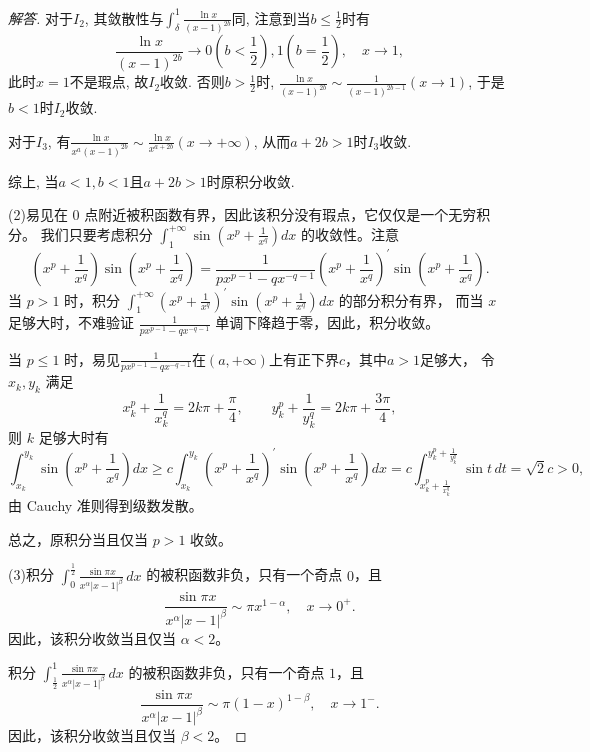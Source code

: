 \begin{a}
\begin{enumerate}
\begin{proof}[解答]
对于\(I_2\), 其敛散性与\(\int_{\delta}^{1}\frac{\ln x}{(x-1)^{2b}}\)同, 
注意到当\(b\leqslant\frac{1}{2}\)时有
\[\frac{\ln x}{(x-1)^{2b}}\rightarrow 0\left(b<\frac{1}{2}\right),1\left(b=\frac{1}{2}\right),\quad x\rightarrow 1,\]
此时\(x=1\)不是瑕点, 故\(I_2\)收敛. 否则\(b>\frac{1}{2}\)时, \(\frac{\ln x}{(x-1)^{2b}}\sim\frac{1}{(x-1)^{2b-1}}(x\rightarrow 1)\), 于是\(b<1\)时\(I_2\)收敛.

对于\(I_3\), 有\(\frac{\ln x}{x^a(x-1)^{2b}}\sim\frac{\ln x}{x^{a+2b}}(x\rightarrow+\infty)\), 从而\(a+2b>1\)时\(I_3\)收敛.

综上, 当\(a<1,b<1\)且\(a+2b>1\)时原积分收敛.

(2)易见在 $0$ 点附近被积函数有界，因此该积分没有瑕点，它仅仅是一个无穷积分。
我们只要考虑积分 \(\int_{1}^{+\infty} \sin \left(x^{p}+\frac{1}{x^{q}}\right) d x\) 的收敛性。注意
\[\left(x^{p}+\frac{1}{x^{q}}\right) \sin \left(x^{p}+\frac{1}{x^{q}}\right)
=\frac{1}{p x^{p-1}-q x^{-q-1}}\left(x^{p}+\frac{1}{x^{q}}\right)^{\prime} \sin \left(x^{p}+\frac{1}{x^{q}}\right).\]
当 $p>1$ 时，积分 \(\int_{1}^{+\infty}\left(x^{p}+\frac{1}{x^{q}}\right)^{\prime} \sin \left(x^{p}+\frac{1}{x^{q}}\right) d x\) 的部分积分有界，
而当 $x$ 足够大时，不难验证 \(\frac{1}{p x^{p-1}-q x^{-q-1}}\) 单调下降趋于零，因此，积分收敛。

当 $p \leqslant 1$ 时，易见\(\frac{1}{p x^{p-1}-q x^{-q-1}}\)在$(a,+\infty)$上有正下界$c$，其中$a>1$足够大，
令 $x_{k}, y_{k}$ 满足 \[x_{k}^{p}+\frac{1}{x_{k}^{q}}=2k\pi+\frac{\pi}{4}, \qquad y_{k}^{p}+\frac{1}{y_{k}^{q}}=2k\pi+\frac{3 \pi}{4},\]
则 $k$ 足够大时有
\[\int_{x_{k}}^{y_{k}} \sin \left(x^{p}+\frac{1}{x^{q}}\right) d x 
\geqslant c \int_{x_{k}}^{y_{k}}\left(x^{p}+\frac{1}{x^{q}}\right)^{\prime} \sin \left(x^{p}+\frac{1}{x^{q}}\right) d x 
=c\int_{x_{k}^{p}+\frac{1}{x_{k}^{q}}}^{y_{k}^{p}+\frac{1}{y_{k}^{q}}}\sin t\,dt
=\sqrt{2}c>0,\]
由 Cauchy 准则得到级数发散。

总之，原积分当且仅当 $p>1$ 收敛。

(3)积分 \(\int_0^{\frac{1}{2}} \frac{\sin \pi x}{x^\alpha|x-1|^\beta} \, d x\) 的被积函数非负，只有一个奇点 $0$，且
$$\frac{\sin \pi x}{x^\alpha|x-1|^\beta} \sim \pi x^{1-\alpha}, \quad x \rightarrow 0^{+}.$$
因此，该积分收敛当且仅当 $\alpha<2$。

积分 \(\int_{\frac{1}{2}}^1 \frac{\sin \pi x}{x^\alpha|x-1|^\beta} \, d x\) 的被积函数非负，只有一个奇点 $1$，且
$$\frac{\sin \pi x}{x^\alpha|x-1|^\beta} \sim \pi(1-x)^{1-\beta}, \quad x \rightarrow 1^{-}.$$
因此，该积分收敛当且仅当 $\beta<2$。


\end{proof}
\end{enumerate}
\end{a}
